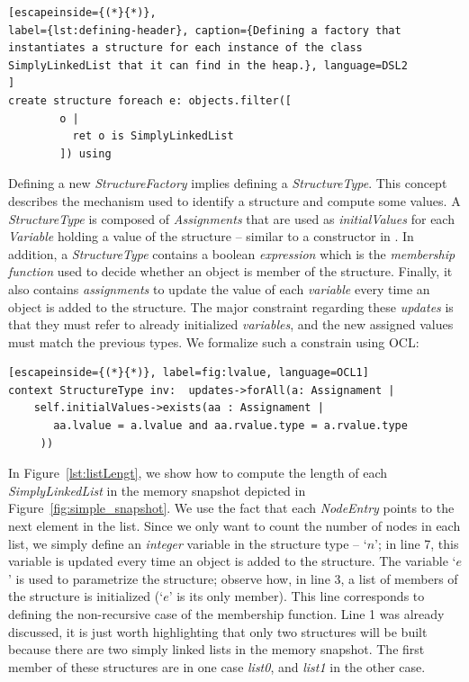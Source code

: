 \begin{lstlisting}[escapeinside={(*}{*)}, 
label={lst:defining-header}, caption={Defining a factory that instantiates a structure for each instance of the class SimplyLinkedList that it can find in the heap.}, language=DSL2
]
create structure foreach e: objects.filter([
		o | 
		  ret o is SimplyLinkedList
		]) using
\end{lstlisting}

Defining a new \textit{StructureFactory} implies defining a \textit{StructureType}.
This concept describes the mechanism used to identify a structure and compute some values.
A \textit{StructureType} is composed of \textit{Assignments} that are used as \textit{initialValues} for each \textit{Variable} holding a value of the structure -- similar to a constructor in .
In addition, a \textit{StructureType} contains a boolean \textit{expression} which is the \textit{membership function} used to decide whether an object is member of the structure.
Finally, it also contains \textit{assignments} to update the value of each \textit{variable} every time an object is added to the structure.
The major constraint regarding these \textit{updates} is that they must refer to already initialized \textit{variables}, and the new assigned values must match the previous types.
We formalize such a constrain using OCL:

\begin{lstlisting}[escapeinside={(*}{*)}, label=fig:lvalue, language=OCL1]
context StructureType inv:  updates->forAll(a: Assignament | 
    self.initialValues->exists(aa : Assignament | 
       aa.lvalue = a.lvalue and aa.rvalue.type = a.rvalue.type
     ))
\end{lstlisting}


In Figure~\ref{lst:listLengt}, we show how to compute the length of each \textit{SimplyLinkedList} in the memory snapshot depicted in Figure~\ref{fig:simple_snapshot}.
We use the fact that each \textit{NodeEntry} points to the next element in the list.
Since we only want to count the number of nodes in each list, we simply define an \textit{integer} variable in the structure type -- `$n$'; in line 7, this variable is updated every time an object is added to the structure.
The variable `$e$' is used to parametrize the structure; observe how, in line 3, a list of members of the structure is initialized (`$e$' is its only member).
This line corresponds to defining the non-recursive case of the membership function.
Line 1 was already discussed, it is just worth highlighting that only two structures will be built because there are two simply linked lists in the memory snapshot.
The first member of these structures are in one case \textit{list0}, and \textit{list1} in the other case.
 

